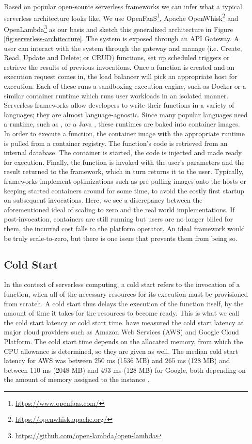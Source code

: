 Based on popular open-source serverless frameworks we can infer what a typical serverless architecture looks like. We use OpenFaaS\footnote{\url{https://www.openfaas.com/}}, Apache OpenWhisk\footnote{\url{https://openwhisk.apache.org/}} and OpenLambda\footnote{\url{https://github.com/open-lambda/open-lambda}} as our basis and sketch this generalized architecture in Figure \ref{fig:serverless-architecture}. The system is exposed through an API Gateway. A user can interact with the system through the gateway and manage (i.e. Create, Read, Update and Delete; or CRUD) functions, set up scheduled triggers or retrieve the results of previous invocations. Once a function is created and an execution request comes in, the load balancer will pick an appropriate host for execution. Each of these runs a sandboxing execution engine, such as Docker or a similar container runtime which runs user workloads in an isolated manner.
Serverless frameworks allow developers to write their functions in a variety of languages; they are almost language-agnostic. Since many popular languages need a runtime, such as ,  or a Java , these runtimes are baked into container images. In order to execute a function, the container image with the appropriate runtime is pulled from a container registry.
The function's code is retrieved from an internal database. The container is started, the code is injected and made ready for execution. Finally, the function is invoked with the user's parameters and the result returned to the framework, which in turn returns it to the user. Typically, frameworks implement optimizations such as pre-pulling images onto the hosts or keeping started containers around for some time, to avoid the costly first startup on subsequent invocations. Here, we see a discrepancy between the aforementioned ideal of scaling to zero and the real world implementations. If post-invocation, containers are still running but users are no longer billed for them, the incurred cost falls to the platform operator. An ideal framework would be truly scale-to-zero, but there is one issue that prevents them from being so.

\subsection{Cold Start}

In the context of serverless computing, a cold start refers to the invocation of a function, when all of the necessary resources for its execution must be provisioned from scratch. A cold start thus delays the execution of the function itself, by the amount of time it takes for the resources to become ready. This is what we call the cold start latency or cold start time. \citeauthor{Wang2018} have measured the cold start latency at major cloud providers such as Amazon Web Services (AWS) and Google Cloud Platform. The cold start time depends on the allocated memory, from which the CPU allowance is determined, so they are given as well. The median cold start latency for AWS was between 250 ms (1536 MB) and 265 ms (128 MB) and between 110 ms (2048 MB) and 493 ms (128 MB) for Google, both depending on the amount of memory assigned to the instance \cite{Wang2018}.

